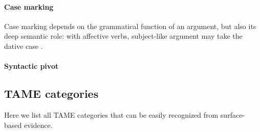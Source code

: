 \documentclass[a4paper, oneside, 12pt]{report}
\newcommand*{\citetable}[1]{Table~{#1}}
\begin{document}
\paragraph*{Case marking} 
Case marking depends on the grammatical function of an argument, 
but also its deep semantic role: 
with affective verbs, subject-like argument may take the dative case 
\citep[\citetable{19.1}]{forker2020grammar}. 

\paragraph*{Syntactic pivot} 

\subsection{TAME categories} 

Here we list all TAME categories that can be easily recognized from surface-based evidence.
\end{document}
